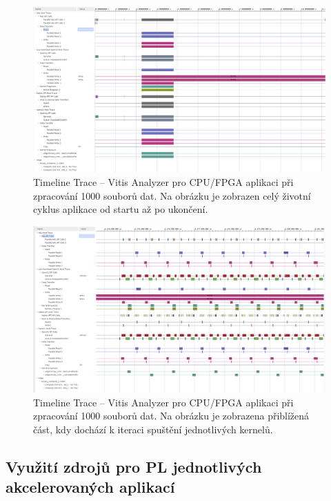 \documentclass[a4paper, twoside, 11pt]{article}
\newcommand{\fbar}{\FloatBarrier}
\begin{document}
	\begin{figure}[htbp!]
		\centering
		\includegraphics[width=1\textwidth]{src/png/vitis-analyzer/rt/cpu-fpga-model-1k-values-0.000001-step/writing-data-output/rt-timeline-trace-zoom-out.png}
		\caption{Timeline Trace – Vitis Analyzer pro CPU/FPGA aplikaci při zpracování 1000 souborů dat. Na obrázku je zobrazen celý životní cyklus aplikace od startu až po ukončení.}
		\label{fig:rt-timeline-trace-zoom-out}
	\end{figure}

	\begin{figure}[htbp!]
		\centering
		\includegraphics[width=1\textwidth]{src/png/vitis-analyzer/rt/cpu-fpga-model-1k-values-0.000001-step/writing-data-output/rt-timeline-trace-execution-start-zoom-in.png}
		\caption{Timeline Trace – Vitis Analyzer pro CPU/FPGA aplikaci při zpracování 1000 souborů dat. Na obrázku je zobrazena přiblížená část, kdy dochází k iteraci spuštění jednotlivých kernelů.}
		\label{fig:rt-timeline-trace-execution-start-zoom-in}
	\end{figure}

	\fbar
	\subsection{Využití zdrojů pro PL jednotlivých akcelerovaných aplikací}\label{subsec:vyuziti-zdroju-pro-pl-jednotlivych-akcelerovanych-aplikaci}
\end{document}
